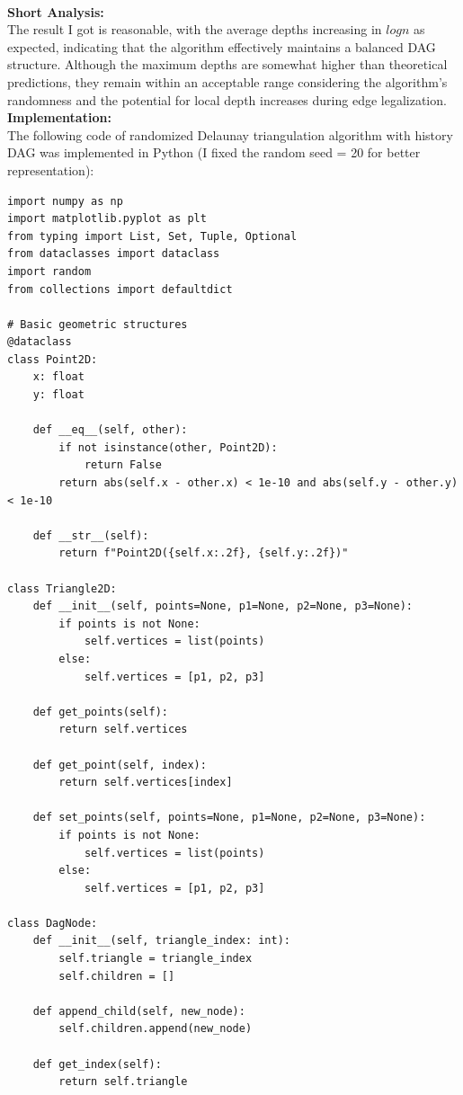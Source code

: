 \documentclass{article}
\begin{document}
\hspace{0.01cm}
\\
\textbf{Short Analysis: }
\\
The result I got is reasonable, with the average depths increasing in $log n$ as expected, indicating that the algorithm effectively maintains a balanced DAG structure. 
Although the maximum depths are somewhat higher than theoretical predictions, they remain within an acceptable range considering the algorithm's randomness and the potential for local depth increases during edge legalization. 
\\
\textbf{Implementation: }
\\
The following code of randomized Delaunay triangulation algorithm with history DAG was implemented in Python (I fixed the random seed = 20 for better representation):
\begin{lstlisting}
import numpy as np
import matplotlib.pyplot as plt
from typing import List, Set, Tuple, Optional
from dataclasses import dataclass
import random
from collections import defaultdict

# Basic geometric structures
@dataclass
class Point2D:
    x: float
    y: float
    
    def __eq__(self, other):
        if not isinstance(other, Point2D):
            return False
        return abs(self.x - other.x) < 1e-10 and abs(self.y - other.y) < 1e-10
    
    def __str__(self):
        return f"Point2D({self.x:.2f}, {self.y:.2f})"

class Triangle2D:
    def __init__(self, points=None, p1=None, p2=None, p3=None):
        if points is not None:
            self.vertices = list(points)
        else:
            self.vertices = [p1, p2, p3]
    
    def get_points(self):
        return self.vertices
    
    def get_point(self, index):
        return self.vertices[index]
    
    def set_points(self, points=None, p1=None, p2=None, p3=None):
        if points is not None:
            self.vertices = list(points)
        else:
            self.vertices = [p1, p2, p3]

class DagNode:
    def __init__(self, triangle_index: int):
        self.triangle = triangle_index
        self.children = []
    
    def append_child(self, new_node):
        self.children.append(new_node)
    
    def get_index(self):
        return self.triangle
    

\end{lstlisting}
\end{document}
